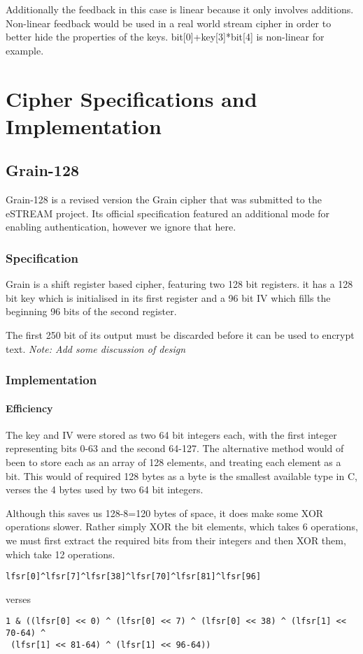 \documentclass{report}
\begin{document}
Additionally the feedback in this case is linear because it only involves additions. Non-linear feedback would be used in a real world stream cipher in order to better hide the properties of the keys. bit[0]+key[3]*bit[4] is non-linear for example.
\chapter{Cipher Specifications  and Implementation}
\section{Grain-128}
Grain-128 is a revised version the Grain cipher that was submitted to the eSTREAM project. Its official specification featured an additional mode for enabling authentication, however we ignore that here.
\subsection{Specification}
Grain is a shift register based cipher, featuring two 128 bit registers. it has a 128 bit key which is initialised in its first register and a 96 bit IV which fills the beginning 96 bits of the second register.

The first 250 bit of its output must be discarded before it can be used to encrypt text.
\textit{Note: Add some discussion of design}
\subsection{Implementation}
\subsubsection{Efficiency}
The key and IV were stored as two 64 bit integers each, with the first integer representing bits 0-63 and the second 64-127. The alternative method would of been to store each as an array of 128 elements, and treating each element as a bit. This would of required 128 bytes as a byte is the smallest available type in C, verses the 4 bytes used by two 64 bit integers.

Although this saves us 128-8=120 bytes of space, it does make some XOR operations slower. Rather simply XOR the bit elements, which takes 6 operations, we must first extract the required bits from their integers and then XOR them, which take 12 operations.
\begin{verbatim}
lfsr[0]^lfsr[7]^lfsr[38]^lfsr[70]^lfsr[81]^lfsr[96]
\end{verbatim}
verses
\begin{verbatim}
1 & ((lfsr[0] << 0) ^ (lfsr[0] << 7) ^ (lfsr[0] << 38) ^ (lfsr[1] << 70-64) ^
 (lfsr[1] << 81-64) ^ (lfsr[1] << 96-64))
\end{verbatim}
\end{document}
